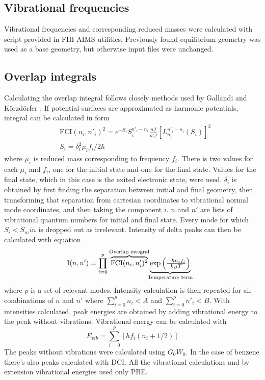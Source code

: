 \documentclass{article}
\begin{document}
\subsection{Vibrational frequencies}

Vibrational frequencies and corresponding reduced masses were calculated with script provided in FHI-AIMS utilities. Previously found equilibrium geometry was used as a base geometry, but otherwise input files were unchanged.

\subsection{Overlap integrals}

Calculating the overlap integral follows closely methods used by Gallandi and K\"orzd\"orfer \cite{gall2015}. If potential surfaces are approximated as harmonic potentials, integral can be calculated in form
\begin{align}
    & \mathrm{FCI}(n_i, n'_i)^2 = e^{-S_i}S_i^{n'_i-n_I} \frac{n_i!}{n'_i!} \left[L_{n_i}^{n'_i-n_i}(S_i)\right]^2 \nonumber \\
    & S_i = \delta_i^2 \mu_i f_i/2\hbar \nonumber
\end{align}
where $\mu_i$ is reduced mass corresponding to frequency $f_i$. There is two values for each $\mu_i$ and $f_i$, one for the initial state and one for the final state. Values for the final state, which in this case is the exited electronic state, were used. $\delta_i$ is obtained by first finding the separation between initial and final geometry, then transforming that separation from cartesian coordinates to vibrational normal mode coordinates, and then taking the component $i$. $n$ and $n'$ are lists of vibrational quantum numbers for initial and final state. Every mode for which $S_i < S_min$ is dropped out as irrelevant. Intensity of delta peaks can then be calculated with equation
\begin{align}
    \mathrm{I}(n, n') &= \prod_{i=0}^p \;
    {\overbrace{\textstyle \mathrm{FCI}(n_i, n'_i)^2}^{\mathclap{\text{Overlap integral}}}} \;
    {\underbrace{\textstyle \exp\left( \frac{-\hbar n_i f_i}{k_B T} \right)}_{\mathclap{\text{Temperature term}}}} \nonumber 
\end{align}
where $p$ is a set of relevant modes. Intensity calculation is then repeated for all combinations of $n$ and $n'$ where $\sum_{i=0}^p n_i < A$ and $\sum_{i=0}^p n'_i < B$. With intensities calculated, peak energies are obtained by adding vibrational energy to the peak without vibrations. Vibrational energy can be calculated with $$E_{vib} = \sum_{i=0}^p \left[h f_i(n_i + 1/2)\right]$$ 
The peaks without vibrations were calculated using $G_0W_0$. In the case of benzene there's also peaks calculated with DCI. All the vibrational calculations and by extension vibrational energies used only PBE.
\end{document}
